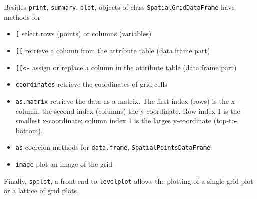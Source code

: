 \documentclass{article}
\begin{document}
Besides {\tt print}, {\tt summary}, {\tt plot},
objects of class {\tt SpatialGridDataFrame} have methods for
\begin{itemize}
\item \verb|[| select rows (points) or columns (variables)
\item \verb|[[| retrieve a column from the attribute table (data.frame part)
\item \verb|[[<-| assign or replace a column in the attribute table (data.frame part)
\item {\tt coordinates} retrieve the coordinates of grid cells
\item {\tt as.matrix} retrieve the data as a matrix. The first index (rows) is the
x-column, the second index (columns) the y-coordinate. Row index 1 is the smallest
x-coordinate; column index 1 is the larges y-coordinate (top-to-bottom).
\item {\tt as} coercion methods for {\tt data.frame}, {\tt SpatialPointsDataFrame}
\item{\tt image} plot an image of the grid
\end{itemize}
Finally, {\tt spplot}, a front-end to {\tt levelplot} allows the
plotting of a single grid plot or a lattice of grid plots.
\end{document}
